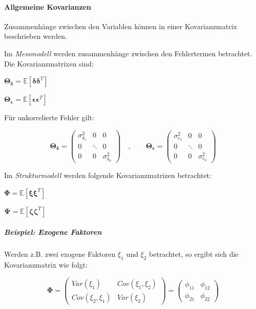 \documentclass{article}
\numberwithin{equation}{section}
\begin{document}
\paragraph*{Allgemeine Kovarianzen}

Zusammenhänge zwischen den Variablen können in einer Kovarianzmatrix beschrieben werden.

Im \emph{Messmodell} werden zusammenhänge zwischen den Fehlertermen betrachtet. Die Kovarianzmatrixen sind:

\begin{compactitem}
\item $\boldsymbol\Theta_{\boldsymbol\delta} = \mathbb{E} \left[ \boldsymbol{\delta\delta}^T \right]$
\item $\boldsymbol\Theta_{\boldsymbol\epsilon} = \mathbb{E} \left[ \boldsymbol{\epsilon\epsilon}^T \right]$
\end{compactitem}

Für unkorrelierte Fehler gilt:

\begin{equation}
\boldsymbol\Theta_{\boldsymbol\delta} =
\begin{pmatrix}
\sigma^2_{\delta_1} & 0 & 0\\
0 & \ddots & 0\\
0 & 0 & \sigma^2_{\delta_n}
\end{pmatrix}
\quad,\qquad
\boldsymbol\Theta_{\boldsymbol\epsilon} =
\begin{pmatrix}
\sigma^2_{\epsilon_1} & 0 & 0\\
0 & \ddots & 0\\
0 & 0 & \sigma^2_{\epsilon_n}
\end{pmatrix}
\end{equation}

Im \emph{Strukturmodell} werden folgende Kovarianzmatrizen betrachtet:

\begin{compactitem}
\item $\boldsymbol\Phi = \mathbb{E} \left[ \boldsymbol{\xi\xi}^T \right]$
\item $\boldsymbol\Psi = \mathbb{E} \left[ \boldsymbol{\zeta\zeta}^T \right]$
\end{compactitem}

\subparagraph{Beispiel: Exogene Faktoren}

Werden z.B. zwei exogene Faktoren $\xi_1$ und $\xi_2$ betrachtet, so ergibt sich die Kovarianzmatrix wie folgt:

\begin{equation}
\boldsymbol\Phi =
\begin{pmatrix}
Var(\xi_1) & Cov(\xi_1,\xi_2)\\
Cov(\xi_2,\xi_1) & Var(\xi_2)
\end{pmatrix} =
\begin{pmatrix}
\phi_{11} & \phi_{12}\\
\phi_{21} & \phi_{22}
\end{pmatrix}
\end{equation}
\end{document}
